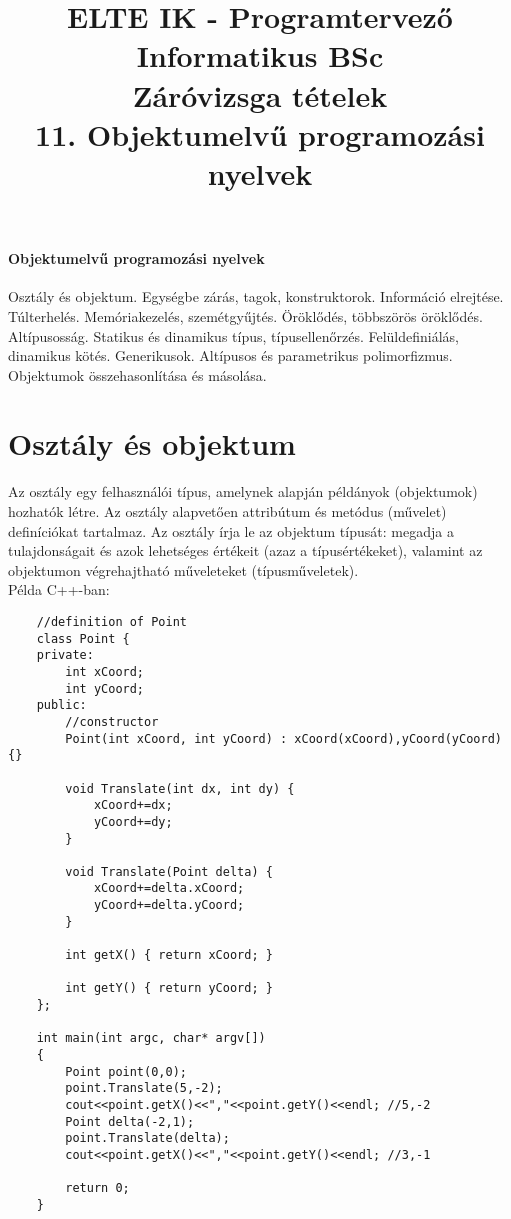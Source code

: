 \documentclass[margin=0px]{article}
\title{\textbf{{\Large ELTE IK - Programtervező Informatikus BSc} \vspace{0.2cm} \\ {\huge Záróvizsga tételek}} \vspace{0.3cm} \\ 11. Objektumelvű programozási nyelvek}
\author{}
\date{}
\newenvironment{tetel}[1]{\paragraph{#1 \\}}{}
\begin{document}
\maketitle

\begin{tetel}{Objektumelvű programozási nyelvek}
    Osztály és objektum. Egységbe zárás, tagok, konstruktorok. Információ elrejtése. Túlterhelés. Memóriakezelés, szemétgyűjtés. Öröklődés, többszörös öröklődés. Altípusosság. Statikus és dinamikus típus, típusellenőrzés. Felüldefiniálás, dinamikus kötés. Generikusok. Altípusos és parametrikus polimorfizmus. Objektumok összehasonlítása és másolása.
\end{tetel}

\section{Osztály és objektum}

Az osztály egy felhasználói típus, amelynek alapján példányok (objektumok)
hozhatók létre. Az osztály alapvetően attribútum és metódus (művelet) definíciókat
tartalmaz. Az osztály írja le az objektum típusát: megadja a tulajdonságait és azok
lehetséges értékeit (azaz a típusértékeket), valamint az objektumon végrehajtható műveleteket (típusműveletek).\\

\noindent Példa C++-ban:
\begin{verbatim}
    //definition of Point
    class Point {
    private:
        int xCoord;
        int yCoord;
    public:
        //constructor
        Point(int xCoord, int yCoord) : xCoord(xCoord),yCoord(yCoord) {}
        
        void Translate(int dx, int dy) {
            xCoord+=dx;
            yCoord+=dy;
        }
        
        void Translate(Point delta) {
            xCoord+=delta.xCoord;
            yCoord+=delta.yCoord;
        }
        
        int getX() { return xCoord; }
        
        int getY() { return yCoord; }
    };
    
    int main(int argc, char* argv[])
    {
        Point point(0,0);
        point.Translate(5,-2);
        cout<<point.getX()<<","<<point.getY()<<endl; //5,-2
        Point delta(-2,1);
        point.Translate(delta);
        cout<<point.getX()<<","<<point.getY()<<endl; //3,-1
        
        return 0;
    }
    \end{verbatim}
\end{document}

